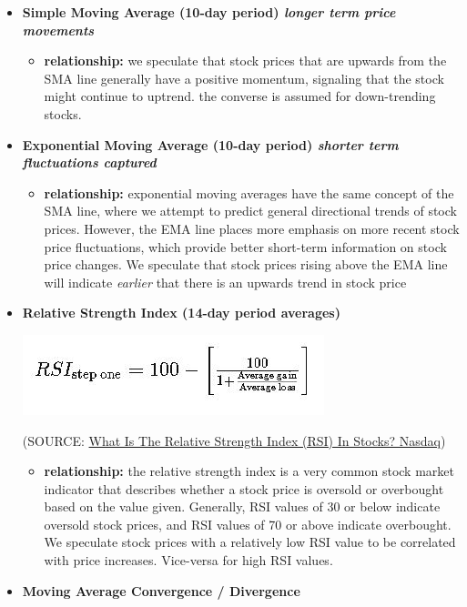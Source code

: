 \documentclass[
]{article}
\providecommand{\tightlist}{%
  \setlength{\itemsep}{0pt}\setlength{\parskip}{0pt}}
\begin{document}
\begin{itemize}
\item
  \textbf{Simple Moving Average (10-day period) \emph{longer term price
  movements}}

  \begin{itemize}
  \tightlist
  \item
    \textbf{relationship:} we speculate that stock prices that are
    upwards from the SMA line generally have a positive momentum,
    signaling that the stock might continue to uptrend. the converse is
    assumed for down-trending stocks.
  \end{itemize}
\item
  \textbf{Exponential Moving Average (10-day period) \emph{shorter term
  fluctuations captured}}

  \begin{itemize}
  \tightlist
  \item
    \textbf{relationship:} exponential moving averages have the same
    concept of the SMA line, where we attempt to predict general
    directional trends of stock prices. However, the EMA line places
    more emphasis on more recent stock price fluctuations, which provide
    better short-term information on stock price changes. We speculate
    that stock prices rising above the EMA line will indicate
    \emph{earlier} that there is an upwards trend in stock price
  \end{itemize}
\item
  \textbf{Relative Strength Index (14-day period averages)}

  \includegraphics{images/Capture.JPG}

  (SOURCE:
  \href{https://www.nasdaq.com/articles/what-is-the-relative-strength-index-rsi-in-stocks}{What
  Is The Relative Strength Index (RSI) In Stocks? \textbar{} Nasdaq})

  \begin{itemize}
  \tightlist
  \item
    \textbf{relationship:} the relative strength index is a very common
    stock market indicator that describes whether a stock price is
    oversold or overbought based on the value given. Generally, RSI
    values of 30 or below indicate oversold stock prices, and RSI values
    of 70 or above indicate overbought. We speculate stock prices with a
    relatively low RSI value to be correlated with price increases.
    Vice-versa for high RSI values.
  \end{itemize}
\item
  \textbf{Moving Average Convergence / Divergence}


\end{itemize}
\end{document}
